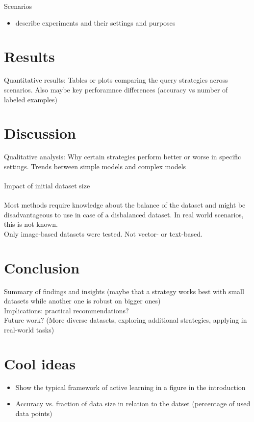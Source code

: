 \documentclass{article}
\theoremstyle{plain}
\theoremstyle{definition}
\theoremstyle{remark}
\begin{document}
Scenarios
\begin{itemize}
	\item describe experiments and their settings and purposes
\end{itemize}

\section{Results}\label{sec:results}
Quantitative results: Tables or plots comparing the query strategies across scenarios. Also maybe key perforamnce differences (accuracy vs number of labeled examples)

\section{Discussion}\label{sec:discussion}
Qualitative analysis: Why certain strategies perform better or worse in specific settings. Trends between simple models and complex models
\\
\\
Impact of initial dataset size
\\
\\
Most methods require knowledge about the balance of the dataset and might be disadvantageous to use in case of a disbalanced dataset. In real world scenarios, this is not known. \\
Only image-based datasets were tested. Not vector- or text-based. 

\section{Conclusion}\label{sec:conclusion}
Summary of findings and insights (maybe that a strategy works best with small datasets while another one is robust on bigger ones)
\\
Implications: practical recommendations?
\\
Future work? (More diverse datasets, exploring additional strategies, applying in real-world tasks)

\newpage

\section{Cool ideas}
\begin{itemize}
	\item Show the typical framework of active learning in a figure in the introduction
	\item Accuracy vs. fraction of data size in relation to the datset (percentage of used data points)
\end{itemize}
\end{document}
